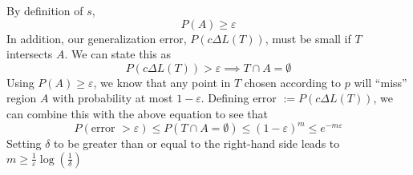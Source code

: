 \documentclass[draft]{exam} %
\renewcommand{\epsilon}{\varepsilon}
\theoremstyle{definition} \newtheorem*{defn}{Definition}
\begin{document}
\begin{questions}
\begin{solution}
  By definition of $s$,
  \[P(A) \geq \epsilon\]
  In addition, our generalization error, $P(c\Delta L(T))$, must be small if
  $T$ intersects $A$. We can state this as
  \[P(c\Delta L(T)) > \epsilon \implies T \cap A = \emptyset \]
  Using $P(A) \geq \epsilon$, we know that any point in $T$ chosen according
  to $p$ will ``miss'' region $A$ with probability at most $1- \epsilon$.
  Defining error $:= P(c\Delta L(T))$, we can combine this with the above
  equation to see that 
  \[ P(\text{error } > \epsilon) \leq P(T\cap A = \emptyset) \leq
  (1-\epsilon)^m \leq e^{-m\epsilon}\]
  Setting $\delta$ to be greater than or equal to the right-hand side leads
  to $m \geq \frac{1}{\epsilon} \log(\frac{1}{\delta})$
\end{solution} %
\vfill

\end{questions} 
\end{document}
